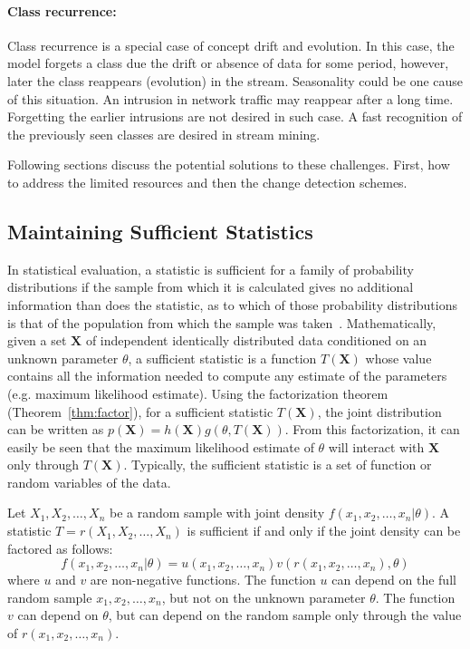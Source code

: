 \paragraph{Class recurrence:}
Class recurrence is a special case of concept drift and evolution. In this case, the model forgets a class due the drift or absence of data for some period, however, later the class reappears (evolution) in the stream. Seasonality could be one cause of this situation. An intrusion in network traffic may reappear after a long time. Forgetting the earlier intrusions are not desired in such case. A fast recognition of the previously seen classes are desired in stream mining.

Following sections discuss the potential solutions to these challenges. First, how to address the limited resources and then the change detection schemes.

\subsection{Maintaining Sufficient Statistics}
In statistical evaluation, a statistic is sufficient for a family of probability distributions if the sample from which it is calculated gives no additional information than does the statistic, as to which of those probability distributions is that of the population from which the sample was taken~\cite{fisher22:suffstat}. Mathematically, given a set  $\mathbf{X}$ of independent identically distributed data conditioned on an unknown parameter $\theta$, a sufficient statistic is a function $T(\mathbf{X})$ whose value contains all the information needed to compute any estimate of the parameters (e.g. maximum likelihood estimate). Using the factorization theorem (Theorem~\ref{thm:factor}), for a sufficient statistic $T(\mathbf{X})$, the joint distribution can be written as $ p(\mathbf{X}) = h(\mathbf{X}) g(\theta, T(\mathbf{X}))$. From this factorization, it can easily be seen that the maximum likelihood estimate of $\theta$ will interact with $\mathbf{X}$ only through $T(\mathbf{X})$. Typically, the sufficient statistic is a set of function or random variables of the data.

\begin{theorem}
    \label{thm:factor}
    Let $X_1, X_2, \dots , X_n$ be a random sample with joint density $f(x_1, x_2, \dots , x_n| \theta)$. A statistic $T = r(X_1, X_2, \dots , X_n)$ is sufficient if and only if the joint density can be factored as follows:
    \[
    f(x_1, x_2, \dots , x_n| \theta) = u(x_1, x_2, \dots , x_n) v(r(x_1, x_2, \dots , x_n), \theta)
    \]
    where $u$ and $v$ are non-negative functions. The function $u$ can depend on the full random sample $x_1, x_2, \dots , x_n$, but not on the unknown parameter $\theta$. The function $v$ can depend on $\theta$, but can depend on the random sample only through the value of $r(x_1, x_2, \dots , x_n)$.
\end{theorem}

